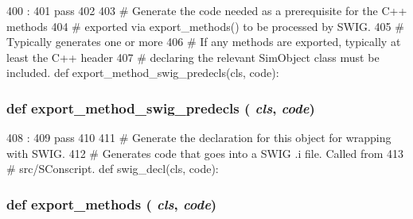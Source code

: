 \begin{DoxyCode}
400                                              :
401         pass
402 
403     # Generate the code needed as a prerequisite for the C++ methods
404     # exported via export_methods() to be processed by SWIG.
405     # Typically generates one or more %
406     # If any methods are exported, typically at least the C++ header
407     # declaring the relevant SimObject class must be included.
    def export_method_swig_predecls(cls, code):
\end{DoxyCode}
\hypertarget{classm5_1_1SimObject_1_1MetaSimObject_ac19f60f4d41b7b37c7f282db24e5d743}{
\subsubsection[{export\_\-method\_\-swig\_\-predecls}]{\setlength{\rightskip}{0pt plus 5cm}def export\_\-method\_\-swig\_\-predecls ( {\em cls}, \/   {\em code})}}
\label{classm5_1_1SimObject_1_1MetaSimObject_ac19f60f4d41b7b37c7f282db24e5d743}



\begin{DoxyCode}
408                                               :
409         pass
410 
411     # Generate the declaration for this object for wrapping with SWIG.
412     # Generates code that goes into a SWIG .i file.  Called from
413     # src/SConscript.
    def swig_decl(cls, code):
\end{DoxyCode}
\hypertarget{classm5_1_1SimObject_1_1MetaSimObject_ab373c5eaef9a7b80491a097389260f4a}{
\subsubsection[{export\_\-methods}]{\setlength{\rightskip}{0pt plus 5cm}def export\_\-methods ( {\em cls}, \/   {\em code})}}
\label{classm5_1_1SimObject_1_1MetaSimObject_ab373c5eaef9a7b80491a097389260f4a}



